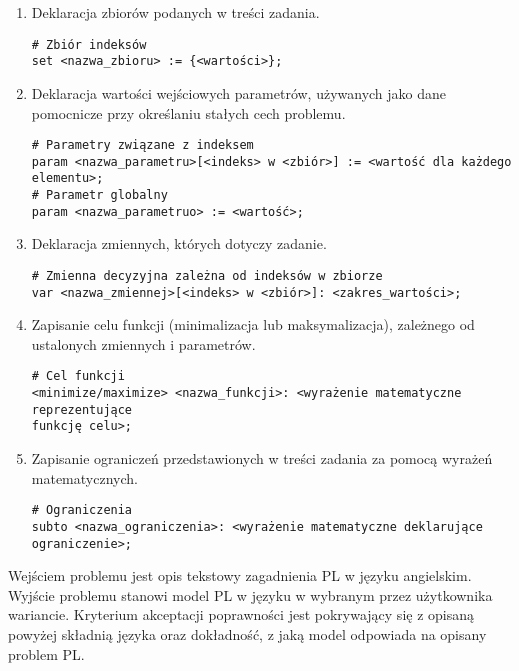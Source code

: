\begin{enumerate}
\item Deklaracja zbiorów podanych w treści zadania.

\begin{lstlisting}[language=zimpl]
# Zbiór indeksów
set <nazwa_zbioru> := {<wartości>};
\end{lstlisting}

\item Deklaracja wartości wejściowych parametrów, używanych jako dane pomocnicze przy określaniu stałych cech problemu.

\begin{lstlisting}[language=zimpl]
# Parametry związane z indeksem
param <nazwa_parametru>[<indeks> w <zbiór>] := <wartość dla każdego elementu>;
# Parametr globalny
param <nazwa_parametruo> := <wartość>;
\end{lstlisting}

\item Deklaracja zmiennych, których dotyczy zadanie.

\begin{lstlisting}[language=zimpl]
# Zmienna decyzyjna zależna od indeksów w zbiorze
var <nazwa_zmiennej>[<indeks> w <zbiór>]: <zakres_wartości>;
\end{lstlisting}

\item Zapisanie celu funkcji (minimalizacja lub maksymalizacja), zależnego od ustalonych zmiennych i parametrów.

\begin{lstlisting}[language=zimpl]
# Cel funkcji
<minimize/maximize> <nazwa_funkcji>: <wyrażenie matematyczne reprezentujące
funkcję celu>;
\end{lstlisting}

\item Zapisanie ograniczeń przedstawionych w treści zadania za pomocą wyrażeń matematycznych.

\begin{lstlisting}[language=zimpl]
# Ograniczenia
subto <nazwa_ograniczenia>: <wyrażenie matematyczne deklarujące ograniczenie>;
\end{lstlisting}
\end{enumerate}

Wejściem problemu jest opis tekstowy zagadnienia PL w języku angielskim. Wyjście problemu stanowi model PL w języku  w wybranym przez użytkownika wariancie. Kryterium akceptacji poprawności jest pokrywający się z opisaną powyżej składnią języka  oraz dokładność, z jaką model odpowiada na opisany problem PL.

